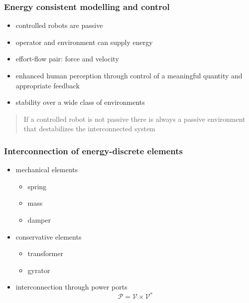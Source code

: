 \documentclass[student]{ITRslides}
\begin{document}
\begin{frame}
	\frametitle{Energy consistent modelling and control}
	\begin{itemize}
		\item controlled robots are passive
		\item operator and environment can supply energy
		\item effort-flow pair: force and velocity
		\end{itemize}
\begin{itemize}%
  \renewcommand{\labelitemi}{$\Rightarrow$}
\item enhanced human perception through control of a meaningful quantity and appropriate feedback
\item stability over a wide class of environments
			\end{itemize}
		\begin{quote}
		If a controlled robot is not passive there is always a passive environment that destabilizes the interconnected system \cite{Stramigioli_15}
		\end{quote}


\end{frame}
\begin{frame}
	\frametitle{Interconnection of energy-discrete elements}
	\begin{itemize}
		\item mechanical elements
			\begin{itemize}
			\item spring
			\item mass
			\item damper
			\end{itemize}
		\item conservative elements
			\begin{itemize}
			\item transformer
			\item gyrator
			\end{itemize}
		\item interconnection through power ports
		\[ \mathcal{P} = \mathcal{V} \times \mathcal{V}^* \]
		\end{itemize}



\end{frame}
\end{document}
